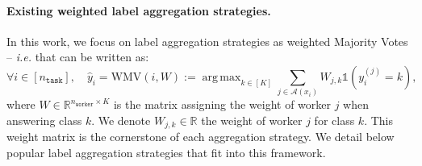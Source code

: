 \documentclass{cap2024}
\DeclareMathOperator*{\argmax}{arg\,max}
\begin{document}
\paragraph{Existing weighted label aggregation strategies.}

In this work, we focus on label aggregation strategies as weighted Majority Votes \citep{littlestone1994weighted} -- \emph{i.e.} that can be written as:
\begin{equation}
  \label{eq:wmv_general}
 \forall i \in [n_\texttt{task}], \quad \hat{y}_i = \text{WMV}(i, W):=\argmax_{k \in [K]} \sum_{j\in\mathcal{A}(x_i)} W_{j,k} \mathds{1}(y_i^{(j)} = k),
\end{equation}
where $W \in \mathbb{R}^{n_\texttt{worker}\times K}$ is the matrix assigning the weight of worker $j$ when answering class $k$.
We denote $W_{j,k}\in\mathbb{R}$ the weight of worker $j$ for class $k$.
This weight matrix is the cornerstone of each aggregation strategy.
We detail below popular label aggregation strategies that fit into this framework.
\end{document}
